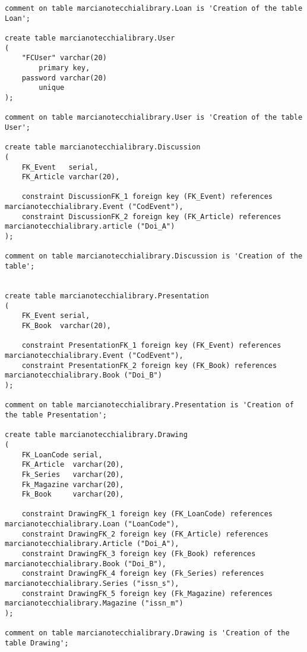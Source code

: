 \begin{lstlisting}
comment on table marcianotecchialibrary.Loan is 'Creation of the table Loan';

create table marcianotecchialibrary.User
(
    "FCUser" varchar(20)
        primary key,
    password varchar(20)
        unique
);

comment on table marcianotecchialibrary.User is 'Creation of the table User';

create table marcianotecchialibrary.Discussion
(
    FK_Event   serial,
    FK_Article varchar(20),

    constraint DiscussionFK_1 foreign key (FK_Event) references marcianotecchialibrary.Event ("CodEvent"),
    constraint DiscussionFK_2 foreign key (FK_Article) references marcianotecchialibrary.article ("Doi_A")
);

comment on table marcianotecchialibrary.Discussion is 'Creation of the table';


create table marcianotecchialibrary.Presentation
(
    FK_Event serial,
    FK_Book  varchar(20),

    constraint PresentationFK_1 foreign key (FK_Event) references marcianotecchialibrary.Event ("CodEvent"),
    constraint PresentationFK_2 foreign key (FK_Book) references marcianotecchialibrary.Book ("Doi_B")
);

comment on table marcianotecchialibrary.Presentation is 'Creation of the table Presentation';

create table marcianotecchialibrary.Drawing
(
    FK_LoanCode serial,
    FK_Article  varchar(20),
    Fk_Series   varchar(20),
    Fk_Magazine varchar(20),
    Fk_Book     varchar(20),

    constraint DrawingFK_1 foreign key (FK_LoanCode) references marcianotecchialibrary.Loan ("LoanCode"),
    constraint DrawingFK_2 foreign key (FK_Article) references marcianotecchialibrary.Article ("Doi_A"),
    constraint DrawingFK_3 foreign key (Fk_Book) references marcianotecchialibrary.Book ("Doi_B"),
    constraint DrawingFK_4 foreign key (Fk_Series) references marcianotecchialibrary.Series ("issn_s"),
    constraint DrawingFK_5 foreign key (Fk_Magazine) references marcianotecchialibrary.Magazine ("issn_m")
);

comment on table marcianotecchialibrary.Drawing is 'Creation of the table Drawing';
\end{lstlisting}